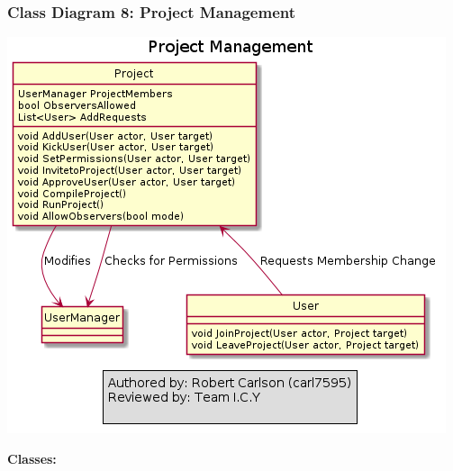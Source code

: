 \documentclass[twoside,letterpaper]{article}
\begin{document}
{\newpage

\subsubsection[Class Diagram 8: Project Management]{\rmfamily\bfseries\color{black}
	Class Diagram 8: Project Management}
\hypertarget{RefHeading22059017292}{}
\bigskip

\includegraphics[width=\textwidth]{images/ClassDiagrams/ProjectManagement}

\textbf{Classes:}
\begin{itemize}


\end{itemize}}
\end{document}
